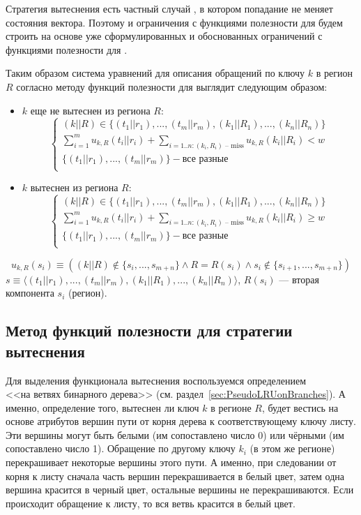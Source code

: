 Стратегия вытеснения \FIFO есть частный случай
\LRU, в котором попадание не меняет состояния вектора.
Поэтому и ограничения с функциями полезности для \FIFO будем строить
на основе уже сформулированных и обоснованных ограничений с
функциями полезности для \LRU. %

Таким образом система уравнений для описания обращений по ключу $k$ в регион $R$
согласно методу функций полезности для \FIFO выглядит следующим образом:
\begin{itemize}
\item $k$ еще не вытеснен из региона $R$:
$$
\left\{\begin{array}{l} (k||R) \in \{(t_1||r_1), ..., (t_m||r_m), (k_1||R_1),
..., (k_n||R_n)\}\\
\sum\limits_{i=1}^m u_{k,R}(t_i||r_i) + \sum\limits_{i=1..n:(k_i,R_i)\mbox{~--
miss}} u_{k,R}(k_i||R_i) < w\\
\{(t_1||r_1), ..., (t_m||r_m)\} - \mbox{все разные}\\
\end{array} \right.
$$
\item $k$ вытеснен из региона $R$:
$$
\left\{\begin{array}{l} (k||R) \in \{(t_1||r_1), ..., (t_m||r_m), (k_1||R_1),
..., (k_n||R_n)\}\\
\sum\limits_{i=1}^m u_{k,R}(t_i||r_i) + \sum\limits_{i=1..n:(k_i,R_i)\mbox{~--
miss}} u_{k,R}(k_i||R_i)
\geqslant w\\
\{(t_1||r_1), ..., (t_m||r_m)\} - \mbox{все разные}\\
\end{array} \right.
$$
\end{itemize}

$$u_{k,R}(s_i) \equiv ((k||R) \notin \{s_i, ..., s_{m+n}\} \wedge
R = R(s_i) \wedge s_i \notin\{s_{i+1},..., s_{m+n}\})$$
$s \equiv \langle (t_1||r_1), ..., (t_m||r_m), (k_1||R_1), ...,
(k_n||R_n)\rangle$, $R(s_i)$ --- вторая компонента $s_i$ (регион).


\subsection{Метод функций полезности для стратегии вытеснения \PseudoLRU}

Для выделения функционала вытеснения воспользуемся определением\\\PseudoLRU <<на
ветвях бинарного дерева>> (см. раздел~\ref{sec:PseudoLRUonBranches}). А именно,
определение того, вытеснен ли ключ $k$ в регионе $R$, будет вестись на основе
атрибутов вершин пути от корня дерева к соответствующему ключу листу. Эти
вершины могут быть белыми (им сопоставлено число 0) или чёрными (им сопоставлено
число 1). Обращение по другому ключу $k_i$ (в этом же регионе) перекрашивает
некоторые вершины этого пути. А именно, при следовании от корня к листу сначала
часть вершин перекрашивается в белый цвет, затем одна вершина красится в черный
цвет, остальные вершины не перекрашиваются. Если происходит обращение к листу,
то вся ветвь красится в белый цвет.

